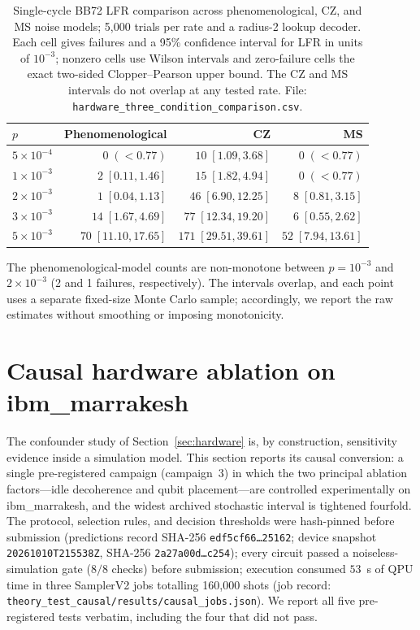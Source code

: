 \documentclass[pdflatex,sn-mathphys-num]{sn-jnl}
\theoremstyle{thmstyleone}
\theoremstyle{thmstyletwo}
\theoremstyle{thmstylethree}
\begin{document}
\begin{table}[htbp]\centering\small
\caption{Single-cycle BB72 LFR comparison across phenomenological, CZ, and MS noise models; 5{,}000 trials per rate and a radius-2 lookup decoder. Each cell gives failures and a 95\% confidence interval for LFR in units of $10^{-3}$; nonzero cells use Wilson intervals and zero-failure cells the exact two-sided Clopper--Pearson upper bound. The CZ and MS intervals do not overlap at any tested rate. File: \texttt{hardware\_three\_condition\_comparison.csv}.}
\label{tab:hw}
\begin{tabular}{@{}lrrr@{}}
\toprule
$p$ & Phenomenological & CZ & MS \\\midrule
$5\!\times\!10^{-4}$ & $0\;(<0.77)$ & $10\;[1.09,3.68]$ & $0\;(<0.77)$ \\
$1\!\times\!10^{-3}$ & $2\;[0.11,1.46]$ & $15\;[1.82,4.94]$ & $0\;(<0.77)$ \\
$2\!\times\!10^{-3}$ & $1\;[0.04,1.13]$ & $46\;[6.90,12.25]$ & $8\;[0.81,3.15]$ \\
$3\!\times\!10^{-3}$ & $14\;[1.67,4.69]$ & $77\;[12.34,19.20]$ & $6\;[0.55,2.62]$ \\
$5\!\times\!10^{-3}$ & $70\;[11.10,17.65]$ & $171\;[29.51,39.61]$ & $52\;[7.94,13.61]$ \\
\bottomrule
\end{tabular}
\end{table}

The phenomenological-model counts are non-monotone between $p=10^{-3}$ and $2\times10^{-3}$ (2 and 1 failures, respectively). The intervals overlap, and each point uses a separate fixed-size Monte Carlo sample; accordingly, we report the raw estimates without smoothing or imposing monotonicity.

\section{Causal hardware ablation on ibm\_marrakesh}
\label{sec:causal}

The confounder study of Section~\ref{sec:hardware} is, by construction, sensitivity evidence inside a simulation model. This section reports its causal conversion: a single pre-registered campaign (campaign~3) in which the two principal ablation factors---idle decoherence and qubit placement---are controlled experimentally on ibm\_marrakesh, and the widest archived stochastic interval is tightened fourfold. The protocol, selection rules, and decision thresholds were hash-pinned before submission (predictions record SHA-256 \texttt{edf5cf66\ldots 25162}; device snapshot \texttt{20261010T215538Z}, SHA-256 \texttt{2a27a00d\ldots c254}); every circuit passed a noiseless-simulation gate ($8/8$ checks) before submission; execution consumed $53$~s of QPU time in three SamplerV2 jobs totalling 160{,}000 shots (job record: \texttt{theory\_test\_causal/results/causal\_jobs.json}). We report all five pre-registered tests verbatim, including the four that did not pass.
\end{document}
